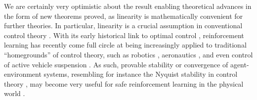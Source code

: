 \documentclass[twoside]{article}
\begin{document}
We are certainly very optimistic about the result enabling theoretical advances in the form of new theorems
proved, as linearity is mathematically convenient for further theories.
In particular, linearity is a crucial assumption in conventional control theory \cite{control-textbook-1,control-textbook-2}. With its early historical link to optimal control \cite{Sutton2005ReinforcementLA-mentions-optimal-control}, reinforcement learning has recently come full circle at being increasingly applied to
traditional ``homegrounds'' of control theory, such as robotics \cite{RL-robotics,Li2021ReinforcementLF},
aeronautics \cite{Wang2022DeepRL}, and even control of active vehicle suspension \cite{RL-car-suspension}.
As such, provable stability or convergence of agent-environment systems,
resembling for instance the Nyquist stability in control theory \cite{Valena1980NyquistCF}, may become very useful for safe reinforcement learning in the physical world \cite{pmlr-v119-stooke20a,Cheng2019EndtoEndSR}.





\pagebreak

\onecolumn

\setcounter{section}{0}

\end{document}
